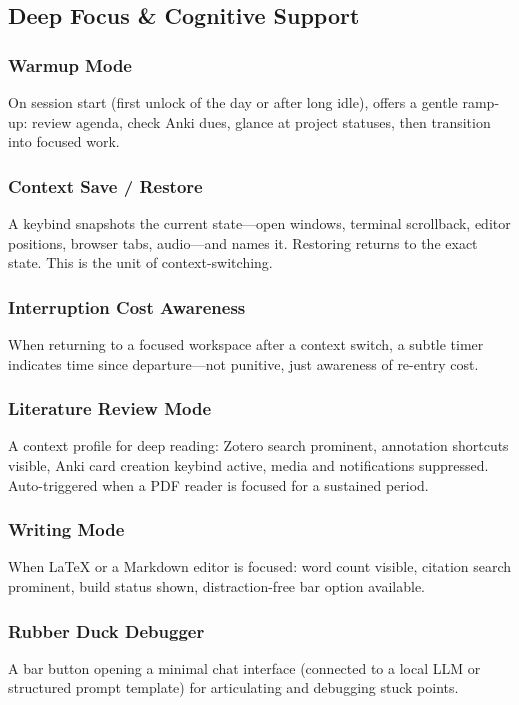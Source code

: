 \documentclass[11pt,a4paper]{article}
\begin{document}
\subsection{Deep Focus \& Cognitive Support}
\label{sec:features-focus}

\subsubsection{Warmup Mode}
On session start (first unlock of the day or after long idle), offers a gentle ramp-up: review agenda, check Anki dues, glance at project statuses, then transition into focused work.

\subsubsection{Context Save / Restore}
A keybind snapshots the current state---open windows, terminal scrollback, editor positions, browser tabs, audio---and names it. Restoring returns to the exact state. This is the unit of context-switching.

\subsubsection{Interruption Cost Awareness}
When returning to a focused workspace after a context switch, a subtle timer indicates time since departure---not punitive, just awareness of re-entry cost.

\subsubsection{Literature Review Mode}
A context profile for deep reading: Zotero search prominent, annotation shortcuts visible, Anki card creation keybind active, media and notifications suppressed. Auto-triggered when a PDF reader is focused for a sustained period.

\subsubsection{Writing Mode}
When \LaTeX{} or a Markdown editor is focused: word count visible, citation search prominent, build status shown, distraction-free bar option available.

\subsubsection{Rubber Duck Debugger}
A bar button opening a minimal chat interface (connected to a local LLM or structured prompt template) for articulating and debugging stuck points.
\end{document}
